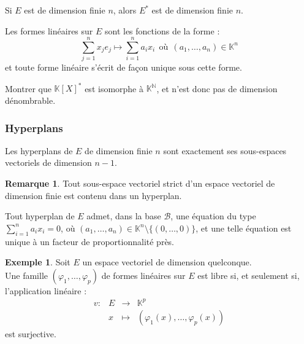 \documentclass[french]{article}
\newcommand{\N}{\mathbb{N}}
\newcommand{\K}{\mathbb{K}}
\newcommand{\st}{^*}
\theoremstyle{plain}
\theoremstyle{definition}
\newtheorem*{ex}{Exemple}
\newtheorem*{rmq}{Remarque}
\theoremstyle{remark}
\begin{document}
\begin{cor}%
	Si $E$ est de dimension finie $n$, alors $E\st$ est de dimension finie $n$.
\end{cor}

\begin{cor}%
	Les formes linéaires sur $E$ sont les fonctions de la forme : $$\sum_{j=1}^{n}x_je_j\longmapsto\sum_{i=1}^{n}a_ix_i\ \ \text{où}\ \ (a_1,\ldots,a_n)\in\K^n$$ et toute forme linéaire s'écrit de façon unique sous cette forme.
\end{cor}

\begin{exo}
	Montrer que $\K[X]\st$ est isomorphe à $\K^\N$, et n'est donc pas de dimension dénombrable.
\end{exo}

\subsubsection*{Hyperplans}

\begin{prop}%
	Les hyperplans de $E$ de dimension finie $n$ sont exactement ses sous-espaces vectoriels de dimension $n-1$.
\end{prop}

\begin{rmq}
	Tout sous-espace vectoriel strict d'un espace vectoriel de dimension finie est contenu dans un hyperplan.
\end{rmq}

\begin{prop}%
	Tout hyperplan de $E$ admet, dans la base $\mathcal{B}$, une équation du type $\displaystyle\sum_{i=1}^{n}a_ix_i=0$, où $(a_1,\ldots,a_n)\in\K^n\setminus\{(0,\ldots,0)\}$, et une telle équation est unique à un facteur de proportionnalité près.
\end{prop}

\begin{ex}%
	Soit $E$ un espace vectoriel de dimension quelconque. \\ Une famille $(\varphi_1,\ldots,\varphi_p)$ de formes linéaires sur $E$ est libre si, et seulement si, l'application linéaire : $$\begin{array}{lrcl}
		v:&E&\longrightarrow&\K^p \\
		&x&\longmapsto&(\varphi_1(x),\ldots,\varphi_p(x))
	\end{array}$$ est surjective.
\end{ex}
\end{document}
